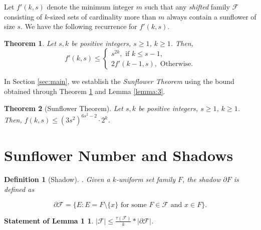 \documentclass[runningheads,12pt,a4paper]{article}
\newtheorem{theorem}{Theorem}
\newtheorem{definition}{Definition}
\newtheorem*{statement1}{Statement of Lemma 1}
\begin{document}
	Let $f'(k,s)$ denote the minimum integer $m$ such that
	any \emph{shifted} family $\mathcal{F}$ consisting of $k$-sized sets of cardinality more than $m$ always contain a sunflower of size $s$. We have the following recurrence for $f'(k,s)$.
	
	\begin{theorem}\label{thm:shifted}
		Let $s,k$ be  positive integers, $s \geq 1$, $k \geq 1$. Then, $$f'(k,s) \leq \begin{cases}
			s^{2k}, \text{ if $k\le s-1$,}\\
			2f'(k-1,s), \text{ Otherwise.}
		\end{cases}$$
	\end{theorem}
	
	
	
	In Section 
	\ref{sec:main}, we establish the \emph{Sunflower Theorem}
	using the bound obtained through Theorem \ref{thm:shifted} and Lemma \ref{lemma:3}. 
	\begin{theorem}[Sunflower Theorem]\label{thm:main1}
			Let $s,k$ be  positive integers, $s \geq 1$, $k \geq 1$. Then, $f(k,s) \leq (3s^2)^{6s^2-2} \cdot 2^{k}$.
	\end{theorem} 
	
	\section{Sunflower Number and Shadows}
	\label{sec:shadow}
	\begin{definition}[Shadow]. Given a $k$-uniform set family $F$, the shadow $\partial F$ is defined as
		
		\[\partial \mathcal F = \{E : E = F \setminus \{x\} \text{ for some } F \in \mathcal F \text{ and } x \in F\}.\]
		
	\end{definition}
	\begin{statement1}
		$|\mathcal F| \leq \frac{\tau(\mathcal F)}{k}*|\partial \mathcal F|$.
	\end{statement1} 
	
\end{document}
